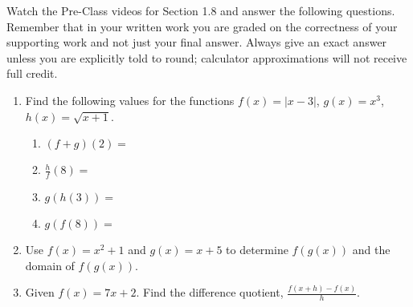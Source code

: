 


\noindent Watch the Pre-Class videos for Section 1.8 and answer the following questions. Remember that in your written work you are graded on the correctness of your supporting work and not just your final answer. Always give an exact answer unless you are explicitly told to round; calculator approximations will not receive full credit. 


\begin{enumerate}

\item Find the following values for the functions $f(x)=|x-3|$, $g(x)=x^3$, $h(x)=\sqrt{x+1}$.
\begin{enumerate}
\item $(f+g)(2)=$
\vfill
\item $\displaystyle \frac{h}{f}(8)=$
\vfill
\item $g(h(3))=$
\vfill
\item $g(f(8))=$
\end{enumerate}



\vfill
\newpage

\item  Use $f(x)=x^2+1$ and $g(x)=x+5$ to determine $f(g(x))$ and the domain of $f(g(x))$.
\vfill



\item Given $f(x)=7x+2$.  Find the difference quotient, $\displaystyle \frac{f(x+h)-f(x)}{h}$.

\vfill






\end{enumerate}


